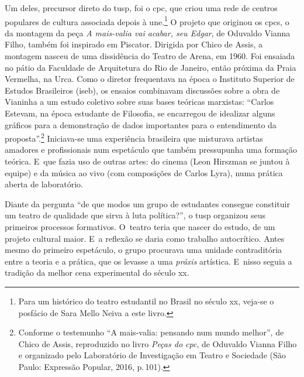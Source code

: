 Um deles, precursor direto do {\sc tusp}, foi o {\sc cpc}, que criou uma rede de
centros populares de cultura associada depois à {\sc une}.\footnote{Para um
  histórico do teatro estudantil no Brasil no século {\sc xx}, veja-se o
  posfácio de Sara Mello Neiva a este livro.} O projeto que originou os
{\sc cpc}s, o da montagem da peça {\it A mais-valia vai acabar, seu Edgar}, de
Oduvaldo Vianna Filho, também foi inspirado em Piscator. Dirigida por
Chico de Assis, a montagem nasceu de uma dissidência do Teatro de Arena,
em 1960. Foi ensaiada no pátio da Faculdade de Arquitetura do Rio de
Janeiro, então próxima da Praia Vermelha, na Urca. Como o diretor
frequentava na época o Instituto Superior de Estudos Brasileiros ({\sc iseb}),
os ensaios combinavam discussões sobre a obra de Vianinha a um estudo
coletivo sobre suas bases teóricas marxistas: “Carlos Estevam, na época
estudante de Filosofia, se encarregou de idealizar alguns gráficos para
a demonstração de dados importantes para o entendimento da
proposta”.\footnote{Conforme o testemunho “A
  mais-valia: pensando num mundo melhor”, de Chico de Assis, reproduzido no livro
  {\it Peças do {\sc cpc}}, de Oduvaldo Vianna Filho e organizado pelo Laboratório de Investigação em Teatro e Sociedade (São Paulo:
  Expressão Popular, 2016, p.\,101).} Iniciava-se uma experiência
brasileira que misturava artistas amadores e profissionais num
espetáculo que também pressupunha uma formação teórica. E~que
fazia uso de outras artes: do cinema (Leon Hirszman se juntou à equipe)
e da música ao vivo (com composições de Carlos Lyra), numa prática
aberta de laboratório.


Diante da pergunta “de que modos um grupo de estudantes consegue
constituir um teatro de qualidade que sirva à luta política?”, o {\sc tusp}
organizou seus primeiros processos formativos. O~teatro teria que nascer
do estudo, de um projeto cultural maior. E~a reflexão se daria como
trabalho autocrítico. Antes mesmo do primeiro espetáculo, o grupo
procurava uma unidade contraditória entre a teoria e a prática, que os
levasse a uma {\it práxis} artística. E~nisso seguia a tradição da
melhor cena experimental do século {\sc xx}.

